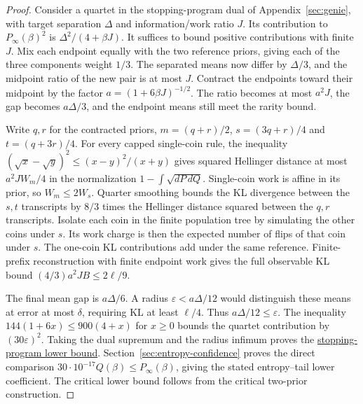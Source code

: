 \begin{proof}
Consider a quartet in the stopping-program dual of Appendix~\ref{sec:genie},
with target separation $\Delta$ and information/work ratio $J$. Its
contribution to $P_\infty(\beta)^2$ is $\Delta^2/(4+\beta J)$.
It suffices to bound positive contributions with finite $J$.
Mix each endpoint equally with the two reference priors, giving each of
the three components weight $1/3$. The separated means now differ by
$\Delta/3$, and the midpoint ratio of the new pair is at most $J$.
Contract the endpoints toward their midpoint by the factor
$a=(1+6\beta J)^{-1/2}$. The ratio becomes at most $a^2J$, the gap
becomes $a\Delta/3$, and the endpoint means still meet the rarity bound.

Write $q,r$ for the contracted priors, $m=(q+r)/2$, $s=(3q+r)/4$ and
$t=(q+3r)/4$. For every capped single-coin rule, the inequality
$(\sqrt x-\sqrt y)^2\le(x-y)^2/(x+y)$ gives squared Hellinger
distance at most $a^2J W_m/4$ in the normalization $1-\int\sqrt{dP\,dQ}$.
Single-coin work is affine in its prior, so $W_m\le2W_s$. Quarter
smoothing bounds the KL divergence between the $s,t$ transcripts by
$8/3$ times the Hellinger distance squared between the $q,r$ transcripts.
Isolate each coin in the finite population tree by simulating the other
coins under $s$. Its work charge is then the expected number of flips
of that coin under $s$. The one-coin KL contributions add under the same
reference. Finite-prefix reconstruction with finite endpoint work gives
the full observable KL bound $(4/3)a^2JB\le2\ell/9$.

The final mean gap is $a\Delta/6$. A radius $\varepsilon<a\Delta/12$
would distinguish these means at error at most $\delta$, requiring KL at
least $\ell/4$. Thus $a\Delta/12\le\varepsilon$. The inequality
$144(1+6x)\le900(4+x)$ for $x\ge0$ bounds the quartet contribution by
$(30\varepsilon)^2$. Taking the dual supremum and the radius infimum
proves the \href{https://github.com/davidiach/adaptive-threshold-estimation/blob/384de1857b55f86cad3d86e6e5801b69d8eb9519/lean/ThresholdHC/ConfidenceProgram/Lower.lean}{stopping-program lower bound}. Section~\ref{sec:entropy-confidence}
proves the direct comparison
$30\cdot10^{-17}Q(\beta)\le P_\infty(\beta)$, giving the stated
entropy--tail lower coefficient.
The critical lower bound follows from the critical two-prior construction.


\end{proof}
